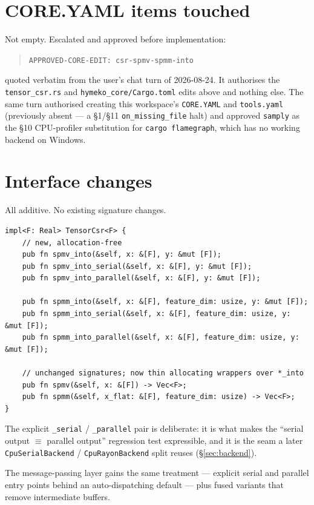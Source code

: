\documentclass[11pt,a4paper]{article}
\begin{document}
\section{CORE.YAML items touched}

Not empty. Escalated and approved before implementation:

\begin{quote}
\texttt{APPROVED-CORE-EDIT: csr-spmv-spmm-into}
\end{quote}

quoted verbatim from the user's chat turn of 2026-08-24. It authorises the
\texttt{tensor\_csr.rs} and \texttt{hymeko\_core/Cargo.toml} edits above and
nothing else. The same turn authorised creating this workspace's
\texttt{CORE.YAML} and \texttt{tools.yaml} (previously absent --- a \S1/\S11
\texttt{on\_missing\_file} halt) and approved \texttt{samply} as the
\S10 CPU-profiler substitution for \texttt{cargo flamegraph}, which has no
working backend on Windows.

\section{Interface changes}

All additive. No existing signature changes.

\begin{lstlisting}[basicstyle=\ttfamily\small,breaklines=true]
impl<F: Real> TensorCsr<F> {
    // new, allocation-free
    pub fn spmv_into(&self, x: &[F], y: &mut [F]);
    pub fn spmv_into_serial(&self, x: &[F], y: &mut [F]);
    pub fn spmv_into_parallel(&self, x: &[F], y: &mut [F]);

    pub fn spmm_into(&self, x: &[F], feature_dim: usize, y: &mut [F]);
    pub fn spmm_into_serial(&self, x: &[F], feature_dim: usize, y: &mut [F]);
    pub fn spmm_into_parallel(&self, x: &[F], feature_dim: usize, y: &mut [F]);

    // unchanged signatures; now thin allocating wrappers over *_into
    pub fn spmv(&self, x: &[F]) -> Vec<F>;
    pub fn spmm(&self, x_flat: &[F], feature_dim: usize) -> Vec<F>;
}
\end{lstlisting}

The explicit \texttt{\_serial} / \texttt{\_parallel} pair is deliberate: it
is what makes the ``serial output $\equiv$ parallel output'' regression test
expressible, and it is the seam a later \texttt{CpuSerialBackend} /
\texttt{CpuRayonBackend} split reuses (\S\ref{sec:backend}).

The message-passing layer gains the same treatment --- explicit serial and
parallel entry points behind an auto-dispatching default --- plus fused
variants that remove intermediate buffers.
\end{document}

